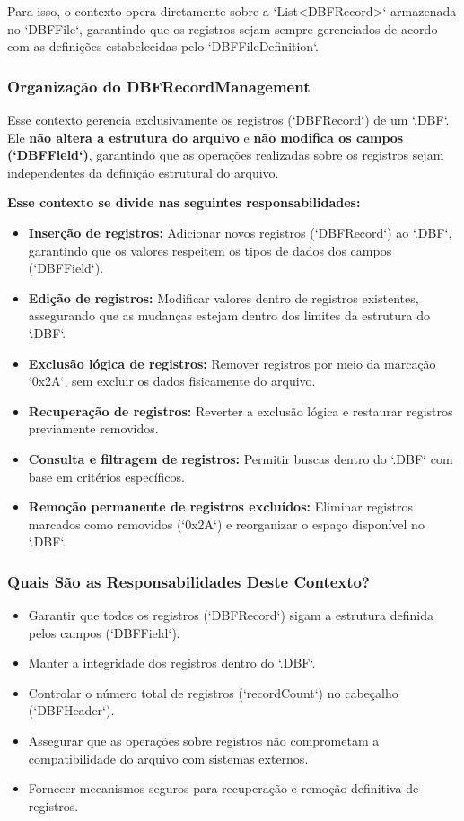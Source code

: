 Para isso, o contexto opera diretamente sobre a `List<DBFRecord>` armazenada no `DBFFile`, garantindo que os registros sejam sempre gerenciados de acordo com as definições estabelecidas pelo `DBFFileDefinition`.

\subsubsection{Organização do DBFRecordManagement}

Esse contexto gerencia exclusivamente os registros (`DBFRecord`) de um `.DBF`. Ele \textbf{não altera a estrutura do arquivo} e \textbf{não modifica os campos (`DBFField`)}, garantindo que as operações realizadas sobre os registros sejam independentes da definição estrutural do arquivo.

\textbf{Esse contexto se divide nas seguintes responsabilidades:}
\begin{itemize}
    \item \textbf{Inserção de registros:} Adicionar novos registros (`DBFRecord`) ao `.DBF`, garantindo que os valores respeitem os tipos de dados dos campos (`DBFField`).
    \item \textbf{Edição de registros:} Modificar valores dentro de registros existentes, assegurando que as mudanças estejam dentro dos limites da estrutura do `.DBF`.
    \item \textbf{Exclusão lógica de registros:} Remover registros por meio da marcação `0x2A`, sem excluir os dados fisicamente do arquivo.
    \item \textbf{Recuperação de registros:} Reverter a exclusão lógica e restaurar registros previamente removidos.
    \item \textbf{Consulta e filtragem de registros:} Permitir buscas dentro do `.DBF` com base em critérios específicos.
    \item \textbf{Remoção permanente de registros excluídos:} Eliminar registros marcados como removidos (`0x2A`) e reorganizar o espaço disponível no `.DBF`.
\end{itemize}

\subsubsection{Quais São as Responsabilidades Deste Contexto?}

\begin{itemize}
    \item Garantir que todos os registros (`DBFRecord`) sigam a estrutura definida pelos campos (`DBFField`).
    \item Manter a integridade dos registros dentro do `.DBF`.
    \item Controlar o número total de registros (`recordCount`) no cabeçalho (`DBFHeader`).
    \item Assegurar que as operações sobre registros não comprometam a compatibilidade do arquivo com sistemas externos.
    \item Fornecer mecanismos seguros para recuperação e remoção definitiva de registros.
\end{itemize}

